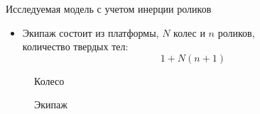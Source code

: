 \begin{frame}{Исследуемая модель с учетом инерции роликов}
    \begin{itemize}
    \item {
        Экипаж состоит из платформы, $N$ колес и $n$ роликов,\\
        количество твердых тел:
        $$1 + N(n+1)$$
    }
    \end{itemize}
    \begin{figure}
        \centering
            \caption{Колесо}
        \endminipage
        \qquad
            \caption{Экипаж}
        \endminipage
    \end{figure}
\end{frame}